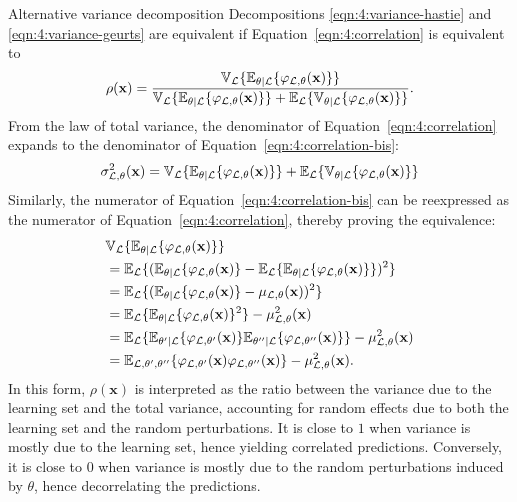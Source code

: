\begin{remark}{Alternative variance decomposition}
Decompositions \ref{eqn:4:variance-hastie} and \ref{eqn:4:variance-geurts} are equivalent if Equation~\ref{eqn:4:correlation}
is equivalent to
\begin{equation}\label{eqn:4:correlation-bis}
\rho(\mathbf{x}) = \frac{\mathbb{V}_{\cal L} \{ \mathbb{E}_{\theta|{\cal L}} \{ \varphi_{{\cal L},\theta}(\mathbf{x}) \} \}}{\mathbb{V}_{\cal L} \{ \mathbb{E}_{\theta|{\cal L}} \{ \varphi_{{\cal L},\theta}(\mathbf{x}) \} \} + \mathbb{E}_{\cal L} \{ \mathbb{V}_{\theta|{\cal L}} \{ \varphi_{{\cal L},\theta}(\mathbf{x}) \} \}}.
\end{equation}
From the law of total variance, the denominator of Equation~\ref{eqn:4:correlation} expands
to the denominator of Equation~\ref{eqn:4:correlation-bis}:
\begin{equation}
\sigma^2_{{\cal L},\theta}(\mathbf{x}) = \mathbb{V}_{\cal L} \{ \mathbb{E}_{\theta|{\cal L}} \{ \varphi_{{\cal L},\theta}(\mathbf{x}) \} \} + \mathbb{E}_{\cal L} \{ \mathbb{V}_{\theta|{\cal L}} \{ \varphi_{{\cal L},\theta}(\mathbf{x}) \} \}
\end{equation}
Similarly, the numerator of Equation~\ref{eqn:4:correlation-bis} can be reexpressed
as the numerator of Equation~\ref{eqn:4:correlation}, thereby proving the equivalence:
\begin{align}
& \mathbb{V}_{\cal L} \{ \mathbb{E}_{\theta|{\cal L}} \{ \varphi_{{\cal L},\theta}(\mathbf{x}) \} \} \nonumber \\
&= \mathbb{E}_{\cal L} \{ (\mathbb{E}_{\theta|{\cal L}} \{ \varphi_{{\cal L},\theta}(\mathbf{x}) \} - \mathbb{E}_{\cal L} \{ \mathbb{E}_{\theta|{\cal L}} \{ \varphi_{{\cal L},\theta}(\mathbf{x})\} \})^2 \} \nonumber \\
&= \mathbb{E}_{\cal L} \{ (\mathbb{E}_{\theta|{\cal L}} \{ \varphi_{{\cal L},\theta}(\mathbf{x}) \} - \mu_{{\cal L},\theta}(\mathbf{x}))^2 \} \nonumber \\
&= \mathbb{E}_{\cal L} \{ \mathbb{E}_{\theta|{\cal L}} \{ \varphi_{{\cal L},\theta}(\mathbf{x}) \}^2 \} - \mu^2_{{\cal L},\theta}(\mathbf{x}) \nonumber \\
&= \mathbb{E}_{\cal L} \{ \mathbb{E}_{\theta^\prime|{\cal L}} \{ \varphi_{{\cal L},\theta^\prime}(\mathbf{x}) \} \mathbb{E}_{\theta^{\prime\prime}|{\cal L}} \{ \varphi_{{\cal L},\theta^{\prime\prime}}(\mathbf{x}) \} \} - \mu^2_{{\cal L},\theta}(\mathbf{x}) \nonumber \\
&= \mathbb{E}_{{\cal L},\theta^\prime,\theta^{\prime\prime}} \{ \varphi_{{\cal L},\theta^\prime}(\mathbf{x}) \varphi_{{\cal L},\theta^{\prime\prime}}(\mathbf{x}) \} - \mu^2_{{\cal L},\theta}(\mathbf{x}).
\end{align}
In this form, $\rho(\mathbf{x})$ is interpreted as the ratio between the variance
due to the learning set  and the total variance, accounting for
random effects due to both the learning set and the random perturbations.
It is close to $1$ when variance is mostly due to the learning set, hence
yielding correlated predictions. Conversely, it is close to $0$ when variance
is mostly due to the random perturbations induced by $\theta$, hence decorrelating
the predictions.
\end{remark}


